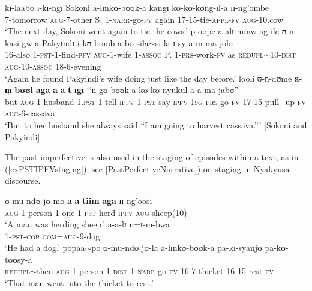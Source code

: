\begin{exe}
\ex \label{exPSTIPFVembeddedOriention} 
\gll kɪ-laabo ɪ-kɪ-ngɪ Sokoni a-lɪnkʊ-bʊʊk-a kangɪ kʊ-kʊ-kʊng-ɪl-a ɪɪ-ng'ombe\\
7-tomorrow \textsc{aug}-7-other S. 1-\textsc{narr}-go-\textsc{fv} again 17-15-tie-\textsc{appl}-\textsc{fv} \textsc{aug}-10.cow\\
\glt `The next day, Sokoni went again to tie the cows.'
\sn \gll p-oope a-alɪ-mmw-ag-ile ʊ-n-kasi gw-a Pakyɪndɪ i-kʊ-bomb-a bo sila$\sim$si-la ɪ-sy-a m-ma-jolo\\
16-also 1-\textsc{pst}-1-find-\textsc{pfv} \textsc{aug}-1-wife 1-\textsc{assoc} P. 1-\textsc{prs}-work-\textsc{fv} as \textsc{redupl}$\sim$10-\textsc{dist} \textsc{aug}-10-\textsc{assoc} 18-6-evening\\
\glt `Again he found Pakyindi's wife doing just like the day before.'
\sn\gll looli ʊ-n̩-dʊme \textbf{a}-\textbf{m̩}-\textbf{bʊʊl}-\textbf{aga} \textbf{a}-\textbf{a}-\textbf{t}-\textbf{ɪgɪ} \textup{\lq\lq}n-gʊ-bʊʊk-a kʊ-kʊ-nyukul-a a-ma-jabʊ\textup{''}\\
but \textsc{aug}-1-husband 1.\textsc{pst}-1-tell-\textsc{ipfv} 1-\textsc{pst}-say-\textsc{ipfv} \phantom{\lq\lq}\textsc{1sg}-\textsc{prs}-go-\textsc{fv} 17-15-pull\_up-\textsc{fv} \textsc{aug}-6-cassava\\
\glt `But to her husband she always said ``I am going to harvest cassava.''{}' [Sokoni and Pakyindi]
\end{exe}

The past imperfective is also used in the staging of episodes within a text, as in (\ref{exPSTIPFVstaging}); see \ref{PastPerfectiveNarrative})  on staging in Nyakyusa  discourse.
\begin{exe}
\ex \label{exPSTIPFVstaging}
\begin{xlist}
\ex \gll ʊ-mu-ndʊ jʊ-mo \textbf{a}-\textbf{a}-\textbf{tiim}-\textbf{aga} ɪɪ-ng'oosi\\
\textsc{aug}-1-person 1-one 1-\textsc{pst}-herd-\textsc{ipfv} \textsc{aug}-sheep(10)\\
\glt \lq A man was herding sheep.'
\ex \gll a-a-lɪ n=ɪ-m-bwa\\
1-\textsc{pst}-\textsc{cop} \textsc{com}=\textsc{aug}-9-dog\\
\glt \lq He had a dog.'
\ex \gll popaa$\sim$po ʊ-mu-ndʊ jʊ-la a-lɪnkʊ-bʊʊk-a pa-kɪ-syanjʊ pa-kʊ-tʊʊsy-a\\
\textsc{redupl}$\sim$then \textsc{aug}-1-person 1-\textsc{dist} 1-\textsc{narr}-go-\textsc{fv} 16-7-thicket 16-15-rest-\textsc{fv}\\
\glt \lq That man went into the thicket to rest.'
\end{xlist}
\end{exe}

